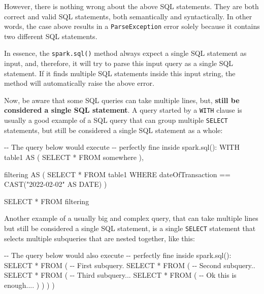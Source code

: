 \documentclass[
  11pt,
  letterpaper,
  DIV=11,
  numbers=noendperiod]{scrreprt}
\newenvironment{Shaded}{\begin{snugshade}}{\end{snugshade}}
\newcommand{\CommentTok}[1]{\textcolor[rgb]{0.37,0.37,0.37}{#1}}
\newcommand{\DataTypeTok}[1]{\textcolor[rgb]{0.68,0.00,0.00}{#1}}
\newcommand{\FunctionTok}[1]{\textcolor[rgb]{0.28,0.35,0.67}{#1}}
\newcommand{\KeywordTok}[1]{\textcolor[rgb]{0.00,0.23,0.31}{#1}}
\newcommand{\NormalTok}[1]{\textcolor[rgb]{0.00,0.23,0.31}{#1}}
\newcommand{\OperatorTok}[1]{\textcolor[rgb]{0.37,0.37,0.37}{#1}}
\newcommand{\OtherTok}[1]{\textcolor[rgb]{0.00,0.23,0.31}{#1}}
\begin{document}
However, there is nothing wrong about the above SQL statements. They are
both correct and valid SQL statements, both semantically and
syntactically. In other words, the case above results in a
\texttt{ParseException} error solely because it contains two different
SQL statements.

In essence, the \texttt{spark.sql()} method always expect a single SQL
statement as input, and, therefore, it will try to parse this input
query as a single SQL statement. If it finds multiple SQL statements
inside this input string, the method will automatically raise the above
error.

Now, be aware that some SQL queries can take multiple lines, but,
\textbf{still be considered a single SQL statement}. A query started by
a \texttt{WITH} clause is usually a good example of a SQL query that can
group multiple \texttt{SELECT} statements, but still be considered a
single SQL statement as a whole:

\begin{Shaded}
\begin{Highlighting}[]
\CommentTok{{-}{-} The query below would execute}
\CommentTok{{-}{-} perfectly fine inside spark.sql():}
\KeywordTok{WITH}\NormalTok{ table1 }\KeywordTok{AS}\NormalTok{ (}
  \KeywordTok{SELECT} \OperatorTok{*}
  \KeywordTok{FROM}\NormalTok{ somewhere}
\NormalTok{),}

\NormalTok{filtering }\KeywordTok{AS}\NormalTok{ (}
  \KeywordTok{SELECT} \OperatorTok{*}
  \KeywordTok{FROM}\NormalTok{ table1}
  \KeywordTok{WHERE}\NormalTok{ dateOfTransaction }\OperatorTok{==} \FunctionTok{CAST}\NormalTok{(}\OtherTok{"2022{-}02{-}02"} \KeywordTok{AS} \DataTypeTok{DATE}\NormalTok{)}
\NormalTok{)}

\KeywordTok{SELECT} \OperatorTok{*}
\KeywordTok{FROM}\NormalTok{ filtering}
\end{Highlighting}
\end{Shaded}

Another example of a usually big and complex query, that can take
multiple lines but still be considered a single SQL statement, is a
single \texttt{SELECT} statement that selects multiple subqueries that
are nested together, like this:

\begin{Shaded}
\begin{Highlighting}[]
\CommentTok{{-}{-} The query below would also execute}
\CommentTok{{-}{-} perfectly fine inside spark.sql():}
\KeywordTok{SELECT} \OperatorTok{*}
\KeywordTok{FROM}\NormalTok{ (}
  \CommentTok{{-}{-} First subquery.}
  \KeywordTok{SELECT} \OperatorTok{*}
  \KeywordTok{FROM}\NormalTok{ (}
    \CommentTok{{-}{-} Second subquery..}
    \KeywordTok{SELECT} \OperatorTok{*}
    \KeywordTok{FROM}\NormalTok{ (}
      \CommentTok{{-}{-} Third subquery...}
      \KeywordTok{SELECT} \OperatorTok{*}
      \KeywordTok{FROM}\NormalTok{ (}
        \CommentTok{{-}{-} Ok this is enough....}
\NormalTok{      )}
\NormalTok{    )}
\NormalTok{  )}
\NormalTok{)}
\end{Highlighting}
\end{Shaded}
\end{document}
